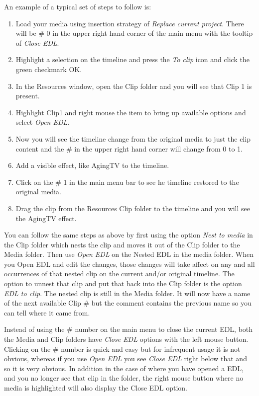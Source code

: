 An example of a typical set of steps to follow is:

\begin{enumerate}
   \item Load your media using insertion strategy of \textit{Replace current project}.  There will be \# 0 in the
    upper right hand corner of the main menu with the tooltip of \textit{Close EDL}.
   \item Highlight a selection on the timeline and press the \textit{To clip} icon and click the green checkmark OK. 
   \item In the Resources window, open the Clip folder and you will see that Clip 1 is present.
   \item Highlight Clip1 and right mouse the item to bring up available options and select \textit{Open EDL}.
   \item Now you will see the timeline change from the original media to just the clip content and the \# in the
    upper right hand corner will change from 0 to 1.
   \item Add a visible effect, like AgingTV to the timeline.
   \item Click on the \# 1 in the main menu bar to see he timeline restored to the original media.
   \item Drag the clip from the Resources Clip folder to the timeline and you will see the AgingTV effect.
\end{enumerate}

You can follow the same steps as above by first using the option \textit{Nest to media} in the Clip folder which nests the clip and moves it out of the Clip folder to the Media folder.  Then use \textit{Open EDL} on the Nested EDL in the media folder.  When you Open EDL and edit the changes, those changes will take affect on any and all occurrences of that nested clip on the current and/or original timeline. The option to unnest that clip and put that back into the Clip folder is the option \textit{EDL to clip}.  The nested clip is still in the Media folder.  It will now have a name of the next available Clip \# but the comment contains the previous name so you can tell where it came from.

Instead of using the \# number on the main menu to close the current EDL, both the Media and Clip folders have \textit{Close EDL} options with the left mouse button. Clicking on the \# number is quick and easy but for infrequent usage it is not obvious, whereas if you use \textit{Open EDL} you see \textit{Close EDL} right below that and so it is very obvious.  In addition in the case of where you have opened a EDL, and you no longer see that clip in the folder, the right mouse button where no media is highlighted will also display the Close EDL option.

